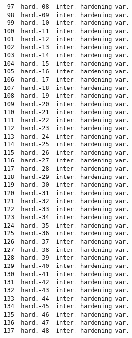 \documentclass[11pt]{report}
\numberwithin{equation}{section}
\begin{document}
\begin{verbatim}
    97  hard.-08  inter. hardening var.                                       
    98  hard.-09  inter. hardening var.                                       
    99  hard.-10  inter. hardening var.                                       
   100  hard.-11  inter. hardening var.                                       
   101  hard.-12  inter. hardening var.                                       
   102  hard.-13  inter. hardening var.                                       
   103  hard.-14  inter. hardening var.                                       
   104  hard.-15  inter. hardening var.                                       
   105  hard.-16  inter. hardening var.                                       
   106  hard.-17  inter. hardening var.                                       
   107  hard.-18  inter. hardening var.                                       
   108  hard.-19  inter. hardening var.                                       
   109  hard.-20  inter. hardening var.                                       
   110  hard.-21  inter. hardening var.                                       
   111  hard.-22  inter. hardening var.                                       
   112  hard.-23  inter. hardening var.                                       
   113  hard.-24  inter. hardening var.                                       
   114  hard.-25  inter. hardening var.                                       
   115  hard.-26  inter. hardening var.                                       
   116  hard.-27  inter. hardening var.                                       
   117  hard.-28  inter. hardening var.                                       
   118  hard.-29  inter. hardening var.                                       
   119  hard.-30  inter. hardening var.                                       
   120  hard.-31  inter. hardening var.                                       
   121  hard.-32  inter. hardening var.                                       
   122  hard.-33  inter. hardening var.                                       
   123  hard.-34  inter. hardening var.                                       
   124  hard.-35  inter. hardening var.                                       
   125  hard.-36  inter. hardening var.                                       
   126  hard.-37  inter. hardening var.                                       
   127  hard.-38  inter. hardening var.                                       
   128  hard.-39  inter. hardening var.                                       
   129  hard.-40  inter. hardening var.                                       
   130  hard.-41  inter. hardening var.                                       
   131  hard.-42  inter. hardening var.                                       
   132  hard.-43  inter. hardening var.                                       
   133  hard.-44  inter. hardening var.                                       
   134  hard.-45  inter. hardening var.                                       
   135  hard.-46  inter. hardening var.                                       
   136  hard.-47  inter. hardening var.                                       
   137  hard.-48  inter. hardening var.                                       
\end{verbatim}
\normalsize 
 
\end{document}
